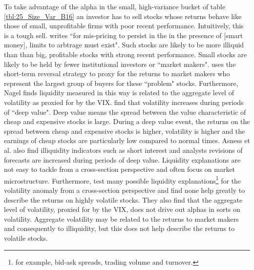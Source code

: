To take advantage of the alpha in the small, high-variance bucket of table
\ref{tbl:25_Size_Var_B16} an investor has to sell stocks whose returns behave
like those of small, unprofitable firms with poor recent performance.
Intuitively, this is a tough sell.
\textcite{nagel2005short} writes ``for mis-pricing to persist in the in the
presence of [smart money], limits to arbtrage must exist".
Such stocks are likely to be more illiquid than than big, profitable stocks
with strong recent performance.
Small stocks are likely to be held by fewer institutional investors or
``market makers".
\textcite{nagel2012evaporating} uses the short-term reversal strategy to proxy
for the returns to market makers who represent the largest group of buyers for
these ``problem" stocks.
Furthermore, Nagel finds liquidity measured in this way is related to the
aggregate level of volatility as proxied for by the VIX.
\textcite{asness2018deep} find that volatility increases during periods of
``deep value".
Deep value means the spread between the value characteristic of cheap and
expensive stocks is large.
During a deep value event, the returns on the spread between cheap and
expensive stocks is higher, volatility is higher and the earnings of cheap
stocks are particularly low compared to normal times.
Asness et al. also find illiquidity indicators such as short
interest and analysts revisions of forecasts are increased during periods of
deep value.
Liquidity explanations are not easy to tackle from a cross-section
perspective and often focus on market microstructure.
Furthermore, \textcite{ang2006cross} test many possible liquidity
explanations\footnote{for example, bid-ask spreads, trading volume and
turnover.} for the volatility anomaly from a cross-section perspective
and find none help greatly to describe the returns on highly volatile stocks.
They also find that the aggregate level of volatility, proxied for by the VIX,
does not drive out alphas in sorts on volatility.
Aggregate volatility may be related to the returns to market makers and
consequently to illiquidity, but this does not help describe the returns to
volatile stocks.

